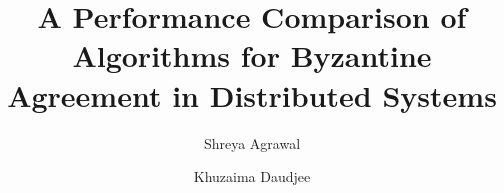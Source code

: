 \title{A Performance Comparison of Algorithms for Byzantine Agreement in
Distributed Systems}


%

\author[uw]{Shreya Agrawal}
\author[uw]{Khuzaima Daudjee}

\address[uw]{University of Waterloo, Waterloo, Canada}

\maketitle


